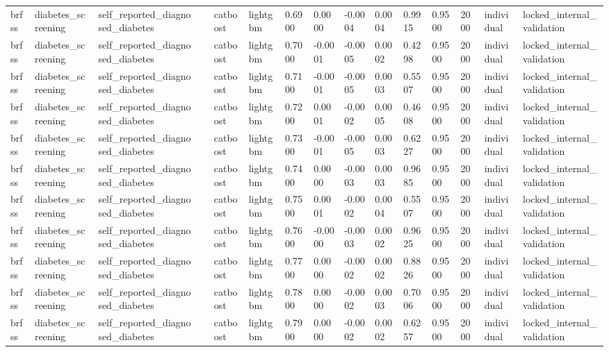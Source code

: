 \begin{tabular}{lllllllllllllll}
brfss & diabetes\_screening & self\_reported\_diagnosed\_diabetes &  & catboost & lightgbm & 0.6900 & 0.0000 & -0.0004 & 0.0004 & 0.9915 & 0.9500 & 2000 & individual & locked\_internal\_validation \\
brfss & diabetes\_screening & self\_reported\_diagnosed\_diabetes &  & catboost & lightgbm & 0.7000 & -0.0001 & -0.0005 & 0.0002 & 0.4298 & 0.9500 & 2000 & individual & locked\_internal\_validation \\
brfss & diabetes\_screening & self\_reported\_diagnosed\_diabetes &  & catboost & lightgbm & 0.7100 & -0.0001 & -0.0005 & 0.0003 & 0.5507 & 0.9500 & 2000 & individual & locked\_internal\_validation \\
brfss & diabetes\_screening & self\_reported\_diagnosed\_diabetes &  & catboost & lightgbm & 0.7200 & 0.0001 & -0.0002 & 0.0005 & 0.4608 & 0.9500 & 2000 & individual & locked\_internal\_validation \\
brfss & diabetes\_screening & self\_reported\_diagnosed\_diabetes &  & catboost & lightgbm & 0.7300 & -0.0001 & -0.0005 & 0.0003 & 0.6227 & 0.9500 & 2000 & individual & locked\_internal\_validation \\
brfss & diabetes\_screening & self\_reported\_diagnosed\_diabetes &  & catboost & lightgbm & 0.7400 & 0.0000 & -0.0003 & 0.0003 & 0.9685 & 0.9500 & 2000 & individual & locked\_internal\_validation \\
brfss & diabetes\_screening & self\_reported\_diagnosed\_diabetes &  & catboost & lightgbm & 0.7500 & 0.0001 & -0.0002 & 0.0004 & 0.5507 & 0.9500 & 2000 & individual & locked\_internal\_validation \\
brfss & diabetes\_screening & self\_reported\_diagnosed\_diabetes &  & catboost & lightgbm & 0.7600 & -0.0000 & -0.0003 & 0.0002 & 0.9625 & 0.9500 & 2000 & individual & locked\_internal\_validation \\
brfss & diabetes\_screening & self\_reported\_diagnosed\_diabetes &  & catboost & lightgbm & 0.7700 & 0.0000 & -0.0002 & 0.0002 & 0.8826 & 0.9500 & 2000 & individual & locked\_internal\_validation \\
brfss & diabetes\_screening & self\_reported\_diagnosed\_diabetes &  & catboost & lightgbm & 0.7800 & 0.0000 & -0.0002 & 0.0003 & 0.7006 & 0.9500 & 2000 & individual & locked\_internal\_validation \\
brfss & diabetes\_screening & self\_reported\_diagnosed\_diabetes &  & catboost & lightgbm & 0.7900 & 0.0000 & -0.0002 & 0.0002 & 0.6257 & 0.9500 & 2000 & individual & locked\_internal\_validation \\

\end{tabular}
